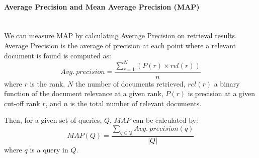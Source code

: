 \paragraph{Average Precision and Mean Average Precision (MAP) }
\ \\
We can measure MAP by calculating Average Precision on retrieval results. Average Precision is the average of precision at each point where a relevant document is found is computed as:
\begin{equation}
Avg. \: precision=\frac{\sum_{r=1}^{N}(P(r)\times rel(r))}{n}
\end{equation}
\noindent
where $ r $ is the rank, $ N $ the number of documents retrieved, $ rel(r) $ a binary function of the document relevance at a given rank, $ P(r) $ is precision at a given cut-off rank $ r $, and $ n $ is the total number of relevant documents.

Then, for a given set of queries, $ Q $, $ MAP $ can be calculated by:
\begin{equation}
MAP(Q)=\frac{\sum_{q\in Q}Avg. \: precision(q)}{|Q|}
\end{equation}
\noindent
where $ q $ is a query in $ Q $.